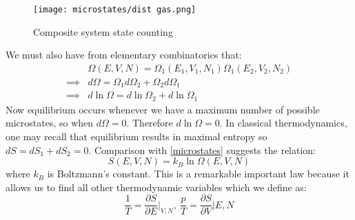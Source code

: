 \documentclass[a4paper,11pt,oneside]{book}
\begin{document}
\begin{figure}[h!]
    \centering
    \texttt{[image: microstates/dist gas.png]}
    \caption{Composite system state counting}
    \label{fig:my_label}
\end{figure}
We must also have from elementary combinatorics that:
\begin{align}
    &\Omega(E,V,N) = \Omega_1(E_1,V_1,N_1) \Omega_1(E_2, V_2, N_2)\\
    \implies &d\Omega = \Omega_1 d\Omega_2 + \Omega_2 d\Omega_1\\
     \implies &d \ln \Omega =  d\ln \Omega_2 +  d\ln \Omega_1 \label{microstates}
\end{align}
Now equilibrium occurs whenever we have a maximum number of possible microstates, so when $d\Omega=0$. Therefore $d \ln \Omega = 0$. In classical thermodynamics, one may recall that equilibrium results in maximal entropy so $dS = dS_1 + dS_2 = 0$. Comparison with \eqref{microstates} suggests the relation:
\begin{equation}
    \boxed{S(E,V,N) = k_B \ln \Omega(E,V,N)}
\end{equation}
where $k_B$ is Boltzmann's constant. This is a remarkable important law because it allows us to find all other thermodynamic variables which we define as:
\begin{equation}
    \frac{1}{T} = \frac{\partial S}{\partial E}\bigg|_{V,N}, \ \frac{p}{T} = \frac{\partial S}{\partial V}\bigg|{E,N}
\end{equation}
\end{document}
